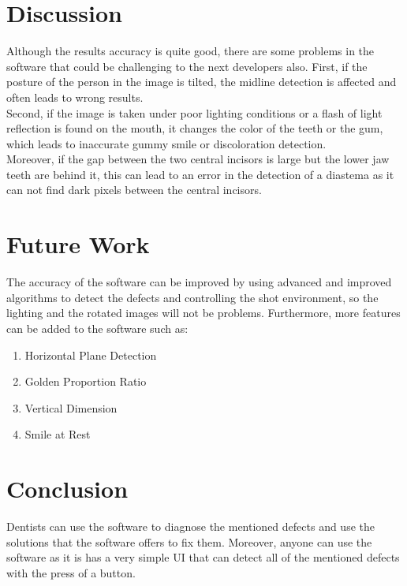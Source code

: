 \documentclass[conference,twocolumn]{IEEEtran}
\begin{document}
\section{\textbf{Discussion}}
Although the results accuracy is quite good, there are some problems in the software that could be challenging to the next developers also.
First, if the posture of the person in the image is tilted, the midline detection is affected and often leads to wrong results.\\
Second, if the image is taken under poor lighting conditions or a flash of light reflection is found on the mouth, it changes the color of the teeth or the gum, which leads to inaccurate gummy smile or discoloration detection.
\\Moreover, if the gap between the two central incisors is large but the lower jaw teeth are behind it, this can lead to an error in the detection of a diastema as it can not find dark pixels between the central incisors.
\section{Future Work}
The accuracy of the software can be improved by using advanced and improved algorithms to detect the defects and controlling the shot environment, so the lighting and the rotated images will not be problems. Furthermore, more features can be added to the software such as:
\begin{enumerate}
    \item Horizontal Plane Detection
    \item Golden Proportion Ratio
    \item Vertical Dimension 
    \item Smile at Rest
\end{enumerate}

\section{Conclusion}
Dentists can use the software to diagnose the mentioned defects and use the solutions that the software offers to fix them. Moreover, anyone can use the software as it is has a very simple UI that can detect all of the mentioned defects with the press of a button.
\end{document}
